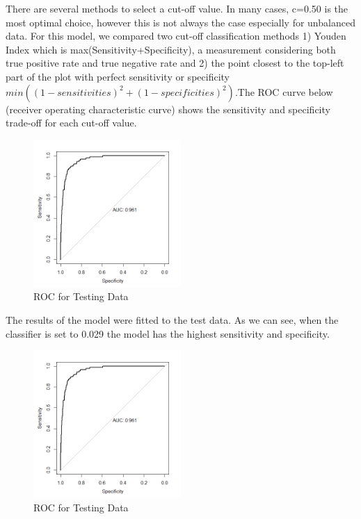 \documentclass[a4paper,man,natbib,11pt]{article}
\begin{document}
There are several methods to select a cut-off value. In many cases, c=0.50 is the most optimal choice, however this is not always the case especially for unbalanced data. For this model, we compared two cut-off classification methods 1) Youden Index which is max(Sensitivity+Specificity), a measurement considering both true positive rate and true negative rate and 2) the point closest to the top-left part of the plot with perfect sensitivity or specificity $min((1-sensitivities)^{2}+(1-specificities)^{2})$.The ROC curve below (receiver operating characteristic curve) shows the sensitivity and specificity trade-off for each cut-off value. 

\begin{figure}[h!]
\centering
  \includegraphics[width=0.5\textwidth]{roc_logistic.png}
  \caption{ROC for Testing Data}
\end{figure}

The results of the model were fitted to the test data. As we can see, when the classifier is set to 0.029 the model has the highest sensitivity and specificity.

\begin{figure}[h!]
\centering
  \includegraphics[width=0.5\textwidth]{roc_logistic.png}
  \caption{ROC for Testing Data}
\end{figure}
\end{document}
